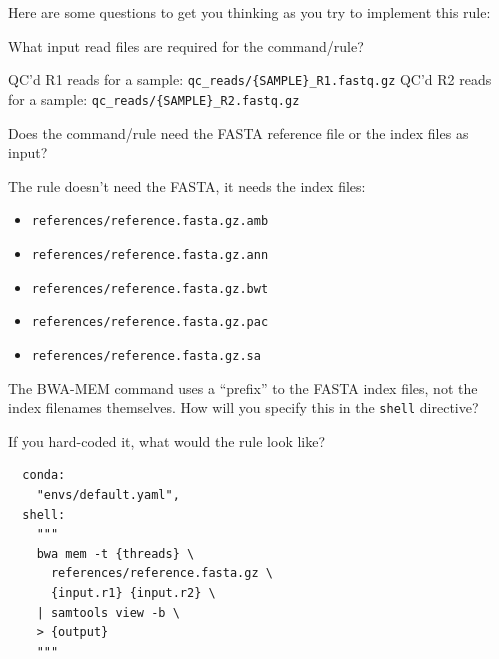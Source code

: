 Here are some questions to get you thinking as you try to implement this rule:

\begin{questions}

What input read files are required for the command/rule?

\begin{answer}

QC'd R1 reads for a sample: \texttt{qc\_reads/\{SAMPLE\}\_R1.fastq.gz}
QC'd R2 reads for a sample: \texttt{qc\_reads/\{SAMPLE\}\_R2.fastq.gz}

\end{answer}

Does the command/rule need the FASTA reference file or the index files as input?

\begin{answer}

The rule doesn't need the FASTA, it needs the index files:

\begin{itemize}
  \item \texttt{references/reference.fasta.gz.amb}
  \item \texttt{references/reference.fasta.gz.ann}
  \item \texttt{references/reference.fasta.gz.bwt}
  \item \texttt{references/reference.fasta.gz.pac}
  \item \texttt{references/reference.fasta.gz.sa}
\end{itemize}

\end{answer}

The BWA-MEM command uses a ``prefix'' to the FASTA index files, not the index filenames themselves.
How will you specify this in the \texttt{shell} directive?

If you hard-coded it, what would the rule look like?

\begin{answer}

\begin{lstlisting}
  conda:
    "envs/default.yaml",
  shell:
    """
    bwa mem -t {threads} \
      references/reference.fasta.gz \
      {input.r1} {input.r2} \
    | samtools view -b \
    > {output}
    """
\end{lstlisting}

\end{answer}

\end{questions}

